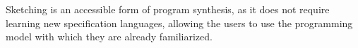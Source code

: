 Sketching is an accessible form of program synthesis, as it does not require
learning new specification languages, allowing the users to use the programming
model with which they are already familiarized.







